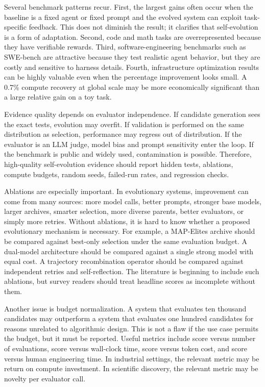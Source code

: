 Several benchmark patterns recur.  First, the largest gains often occur when the baseline is a fixed agent or fixed prompt and the evolved system can exploit task-specific feedback.  This does not diminish the result; it clarifies that self-evolution is a form of adaptation.  Second, code and math tasks are overrepresented because they have verifiable rewards.  Third, software-engineering benchmarks such as SWE-bench are attractive because they test realistic agent behavior, but they are costly and sensitive to harness details.  Fourth, infrastructure optimization results can be highly valuable even when the percentage improvement looks small.  A 0.7\% compute recovery at global scale may be more economically significant than a large relative gain on a toy task.

Evidence quality depends on evaluator independence.  If candidate generation sees the exact tests, evolution may overfit.  If validation is performed on the same distribution as selection, performance may regress out of distribution.  If the evaluator is an LLM judge, model bias and prompt sensitivity enter the loop.  If the benchmark is public and widely used, contamination is possible.  Therefore, high-quality self-evolution evidence should report hidden tests, ablations, compute budgets, random seeds, failed-run rates, and regression checks.

Ablations are especially important.  In evolutionary systems, improvement can come from many sources: more model calls, better prompts, stronger base models, larger archives, smarter selection, more diverse parents, better evaluators, or simply more retries.  Without ablations, it is hard to know whether a proposed evolutionary mechanism is necessary.  For example, a MAP-Elites archive should be compared against best-only selection under the same evaluation budget.  A dual-model architecture should be compared against a single strong model with equal cost.  A trajectory recombination operator should be compared against independent retries and self-reflection.  The literature is beginning to include such ablations, but survey readers should treat headline scores as incomplete without them.

Another issue is budget normalization.  A system that evaluates ten thousand candidates may outperform a system that evaluates one hundred candidates for reasons unrelated to algorithmic design.  This is not a flaw if the use case permits the budget, but it must be reported.  Useful metrics include score versus number of evaluations, score versus wall-clock time, score versus token cost, and score versus human engineering time.  In industrial settings, the relevant metric may be return on compute investment.  In scientific discovery, the relevant metric may be novelty per evaluator call.

